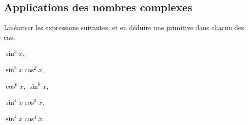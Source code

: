 \documentclass[a4paper, 11pt]{article}
\begin{document}
\subsection*{Applications des nombres complexes}

\begin{exercice}  \;
Lin\'eariser les expressions suivantes, et en d\'eduire une primitive dans chacun des cas.
\begin{enumerate}
\begin{minipage}[t]{0.45\textwidth}
\item $\sin^5{x}$,
\item $\sin^3{x}\cos^2{x}$,
\item $\cos^6{x}$, $\sin^6{x}$,
\end{minipage}
\begin{minipage}[t]{0.45\textwidth}
\item $\sin^4{x}\cos^3{x}$,
\item $\sin^4{x}\cos^4{x}$.
\end{minipage}
\end{enumerate}
\end{exercice}
\end{document}
